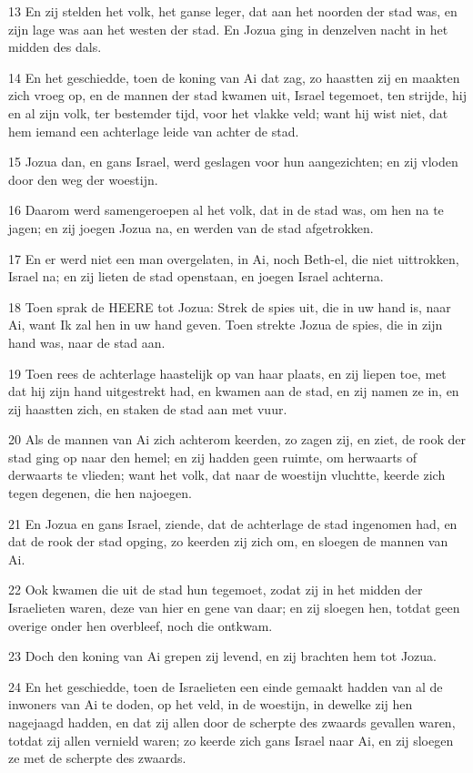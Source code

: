 \par 13 En zij stelden het volk, het ganse leger, dat aan het noorden der stad was, en zijn lage was aan het westen der stad. En Jozua ging in denzelven nacht in het midden des dals.
\par 14 En het geschiedde, toen de koning van Ai dat zag, zo haastten zij en maakten zich vroeg op, en de mannen der stad kwamen uit, Israel tegemoet, ten strijde, hij en al zijn volk, ter bestemder tijd, voor het vlakke veld; want hij wist niet, dat hem iemand een achterlage leide van achter de stad.
\par 15 Jozua dan, en gans Israel, werd geslagen voor hun aangezichten; en zij vloden door den weg der woestijn.
\par 16 Daarom werd samengeroepen al het volk, dat in de stad was, om hen na te jagen; en zij joegen Jozua na, en werden van de stad afgetrokken.
\par 17 En er werd niet een man overgelaten, in Ai, noch Beth-el, die niet uittrokken, Israel na; en zij lieten de stad openstaan, en joegen Israel achterna.
\par 18 Toen sprak de HEERE tot Jozua: Strek de spies uit, die in uw hand is, naar Ai, want Ik zal hen in uw hand geven. Toen strekte Jozua de spies, die in zijn hand was, naar de stad aan.
\par 19 Toen rees de achterlage haastelijk op van haar plaats, en zij liepen toe, met dat hij zijn hand uitgestrekt had, en kwamen aan de stad, en zij namen ze in, en zij haastten zich, en staken de stad aan met vuur.
\par 20 Als de mannen van Ai zich achterom keerden, zo zagen zij, en ziet, de rook der stad ging op naar den hemel; en zij hadden geen ruimte, om herwaarts of derwaarts te vlieden; want het volk, dat naar de woestijn vluchtte, keerde zich tegen degenen, die hen najoegen.
\par 21 En Jozua en gans Israel, ziende, dat de achterlage de stad ingenomen had, en dat de rook der stad opging, zo keerden zij zich om, en sloegen de mannen van Ai.
\par 22 Ook kwamen die uit de stad hun tegemoet, zodat zij in het midden der Israelieten waren, deze van hier en gene van daar; en zij sloegen hen, totdat geen overige onder hen overbleef, noch die ontkwam.
\par 23 Doch den koning van Ai grepen zij levend, en zij brachten hem tot Jozua.
\par 24 En het geschiedde, toen de Israelieten een einde gemaakt hadden van al de inwoners van Ai te doden, op het veld, in de woestijn, in dewelke zij hen nagejaagd hadden, en dat zij allen door de scherpte des zwaards gevallen waren, totdat zij allen vernield waren; zo keerde zich gans Israel naar Ai, en zij sloegen ze met de scherpte des zwaards.
